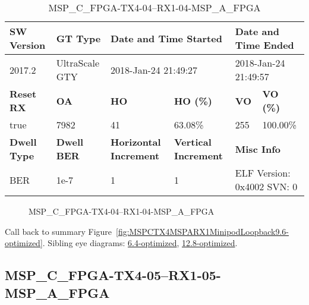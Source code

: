\begin{table}[h]
\centering
\caption{MSP\_C\_FPGA-TX4-04--RX1-04-MSP\_A\_FPGA}
\label{tab:MSPCFPGATX404RX104MSPAFPGA9.6-optimized}
\begin{tabular}{@{}|l|l|l|l|l|l|@{}}
\toprule
\textbf{SW Version}                & \textbf{GT Type}   & \multicolumn{2}{l|}{\textbf{Date and Time Started}}            & \multicolumn{2}{l|}{\textbf{Date and Time Ended}}        \\ \midrule
2017.2                       & UltraScale GTY          & \multicolumn{2}{l|}{2018-Jan-24 21:49:27}                   & \multicolumn{2}{l|}{2018-Jan-24 21:49:57}               \\ \midrule
\textbf{Reset RX}                  & \textbf{OA} & \textbf{HO}   & \textbf{HO (\%)} & \textbf{VO} & \textbf{VO (\%)} \\ \midrule
true & 7982        & 41          & 63.08\%        & 255        & 100.00\%       \\ \midrule
\textbf{Dwell Type}                & \textbf{Dwell BER} & \textbf{Horizontal Increment} & \textbf{Vertical Increment}    & \multicolumn{2}{l|}{\textbf{Misc Info}}                  \\ \midrule
BER                            & 1e-7        & 1        & 1           & \multicolumn{2}{l|}{ELF Version: 0x4002 SVN: 0}                         \\ \bottomrule
\end{tabular}
\end{table}

\begin{figure}[h]
\caption{MSP\_C\_FPGA-TX4-04--RX1-04-MSP\_A\_FPGA} \label{fig:MSPCFPGATX404RX104MSPAFPGA9.6-optimized}
\end{figure}

Call back to summary Figure~\ref{fig:MSPCTX4MSPARX1MinipodLoopback9.6-optimized}.
Sibling eye diagrams: \hyperref[sec:MSPCFPGATX404RX104MSPAFPGA6.4-optimized]{6.4-optimized}, \hyperref[sec:MSPCFPGATX404RX104MSPAFPGA12.8-optimized]{12.8-optimized}.

\clearpage
\newpage


\subsection{MSP\_C\_FPGA-TX4-05--RX1-05-MSP\_A\_FPGA}\label{sec:MSPCFPGATX405RX105MSPAFPGA9.6-optimized}

